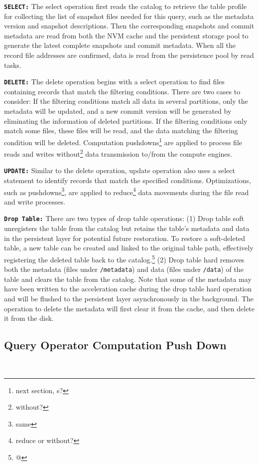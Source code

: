 \noindent \textbf{\texttt{SELECT:}} The select operation first reads the catalog to retrieve the table profile for collecting the list of snapshot files needed for this query, such as the metadata version and snapshot descriptions. Then the corresponding snapshots and commit metadata are read from both the NVM cache and the persistent storage pool to generate the latest complete snapshots and commit metadata. When all the record file addresses are confirmed, data is read from the persistence pool by read tasks.

\noindent \textbf{\texttt{DELETE:}} The delete operation begins with a select operation to find files containing records that match the filtering conditions. There are two cases to consider:
If the filtering conditions match all data in several partitions, only the metadata will be updated, and a new commit version will be generated by eliminating the information of deleted partitions.
If the filtering conditions only match some files, these files will be read, and the data matching the filtering condition will be deleted. Computation pushdowns\footnote{next section, s?} are applied to process file reads and writes without\footnote{without?} data transmission to/from the compute engines.


\noindent \textbf{\texttt{UPDATE:}} Similar to the delete operation, update operation also uses a select statement to identify records that match the specified conditions. Optimizations, such as pushdowns\footnote{same}, are applied to reduce\footnote{reduce or without?} data movements during the file read and write processes.

\noindent \textbf{\texttt{Drop Table:}} There are two types of drop table operations:
 (1) Drop table soft unregisters the table from the catalog but retains the table's metadata and data in the persistent layer for potential future restoration. To restore a soft-deleted table, a new table can be created and linked to the original table path, effectively registering the deleted table back to the catalog.\footnote{@}
(2) Drop table hard  removes both the metadata (files under \texttt{/metadata}) and data (files under \texttt{/data}) of the table and clears the table from the catalog. Note that some of the metadata may have been written to the acceleration cache during the drop table hard operation and will be flushed to the persistent layer asynchronously in the background. The operation to delete the metadata will first clear it from the cache, and then delete it from the disk.

\subsection{Query Operator Computation Push Down}~\label{subsec:pushdown}


